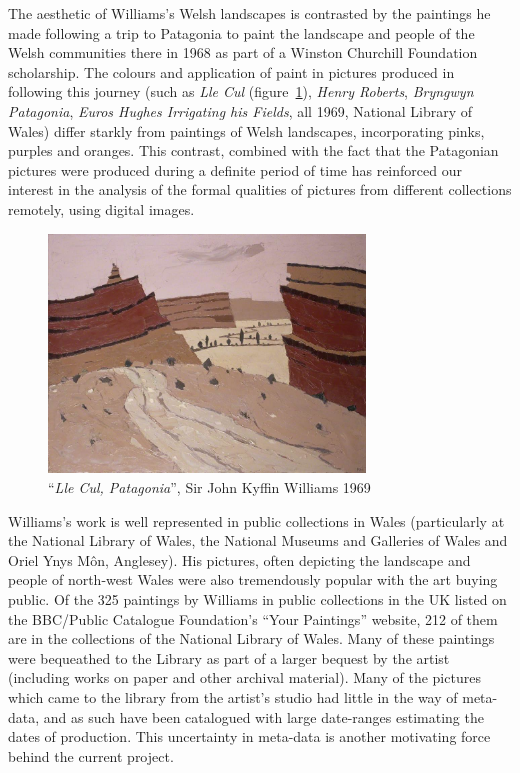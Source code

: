 
The aesthetic of Williams's Welsh landscapes is contrasted by the paintings he
made following a trip to Patagonia to paint the landscape and people of the
Welsh communities there in 1968 as part of a Winston Churchill Foundation
scholarship. The colours and application of paint in pictures produced in
following this journey (such as \emph{Lle Cul} (figure~\ref{fig:lle-cul}), \emph{Henry Roberts},
\emph{Bryngwyn Patagonia}, \emph{Euros Hughes Irrigating his Fields}, all 1969,
National Library of Wales) differ starkly from paintings of Welsh landscapes,
incorporating pinks, purples and oranges. This contrast, combined with the fact
that the Patagonian pictures were produced during a definite period of time has
reinforced our interest in the analysis of the formal qualities of pictures
from different collections remotely, using digital images. 

\begin{figure}[h]
\centering
\includegraphics[width=0.75\textwidth]{img/lle-cul.jpg}
\caption[``\emph{Lle Cul, Patagonia}'']{``\emph{Lle Cul, Patagonia}'', Sir John Kyffin Williams 1969}
\label{fig:lle-cul}
\end{figure}

Williams's work is well represented in public collections in Wales
(particularly at the National Library of Wales, the National Museums and
Galleries of Wales and Oriel Ynys M\^{o}n, Anglesey). His pictures, often
depicting the landscape and people of north-west Wales were also tremendously
popular with the art buying public. Of the 325 paintings by Williams in public
collections in the UK listed on the BBC/Public Catalogue Foundation's ``Your
Paintings'' website, 212 of them are in the collections of the National Library
of Wales\cite{2013Your}. Many of these paintings were bequeathed to the Library
as part of a larger bequest by the artist (including works on paper and other
archival material). Many of the pictures which came to the library from the
artist's studio had little in the way of meta-data, and as such have been
catalogued with large date-ranges estimating the dates of production.  This
uncertainty in meta-data is another motivating force behind the current project.


